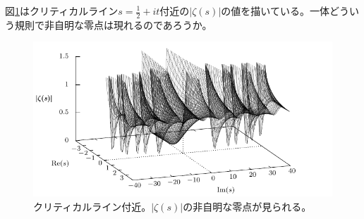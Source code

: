 \documentclass[11pt,b5paper,papersize,dvipdfmx]{jsbook}
\begin{document}
図\ref{fig:3d-hijimei-zeta}はクリティカルライン$s=\frac12+it$付近の$|\zeta(s)|$の値を描いている。一体どういう規則で非自明な零点は現れるのであろうか。
%
\begin{figure}[H]
  \centering
  \includegraphics{nkym/gnuplot/zeta03/hijimei-main.pdf}
  \caption{クリティカルライン付近。$|\zeta(s)|$の非自明な零点が見られる。}
  \label{fig:3d-hijimei-zeta}
\end{figure}







\end{document}
